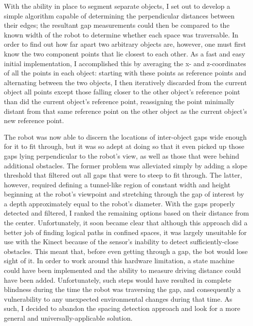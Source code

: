 \documentclass[12pt]{report}
\begin{document}
With the ability in place to segment separate objects, I set out to develop a simple algorithm capable of determining the perpendicular distances between their edges; the resultant gap measurements could then be compared to the known width of the robot to determine whether each space was traversable.  In order to find out how far apart two arbitrary objects are, however, one must first know the two component points that lie closest to each other.  As a fast and easy initial implementation, I accomplished this by averaging the x- and z-coordinates of all the points in each object: starting with these points as reference points and alternating between the two objects, I then iteratively discarded from the current object all points except those falling closer to the other object's reference point than did the current object's reference point, reassigning the point minimally distant from that same reference point on the other object as the current object's new reference point.

The robot was now able to discern the locations of inter-object gaps wide enough for it to fit through, but it was so adept at doing so that it even picked up those gaps lying perpendicular to the robot's view, as well as those that were behind additional obstacles.  The former problem was alleviated simply by adding a slope threshold that filtered out all gaps that were to steep to fit through.  The latter, however, required defining a tunnel-like region of constant width and height beginning at the robot's viewpoint and stretching through the gap of interest by a depth approximately equal to the robot's diameter.  With the gaps properly detected and filtered, I ranked the remaining options based on their distance from the center.  Unfortunately, it soon became clear that although this approach did a better job of finding logical paths in confined spaces, it was largely unsuitable for use with the Kinect because of the sensor's inability to detect sufficiently-close obstacles.  This meant that, before even getting through a gap, the bot would lose sight of it.  In order to work around this hardware limitation, a state machine could have been implemented and the ability to measure driving distance could have been added.  Unfortunately, such steps would have resulted in complete blindness during the time the robot was traversing the gap, and consequently a vulnerability to any unexpected environmental changes during that time.  As such, I decided to abandon the spacing detection approach and look for a more general and universally-applicable solution.
\end{document}
